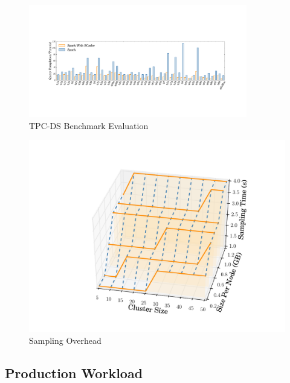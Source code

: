 \begin{figure}
	\includegraphics[width=0.85\textwidth]{fig/tpcds}
	\caption{TPC-DS Benchmark Evaluation}
	\label{fig:tpcds}
	\vspace{-1em}
\end{figure}
\begin{figure}
	\centering
	\includegraphics[width=0.6\linewidth]{fig/sampling}
	\caption{Sampling Overhead}
	\label{fig:sampling}
	\vspace{-1em}
\end{figure}

\subsection{Production Workload}

\ifrevision
{}
\fi

